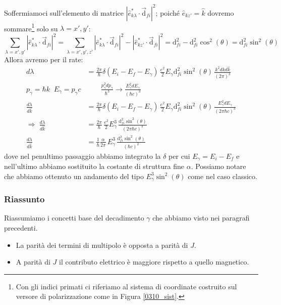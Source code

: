 \newline
\noindent Soffermiamoci sull'elemento di matrice $|\hat{e}^*_{k\lambda}\cdot \vec{\mathrm{d}}_{fi}|^2$; poiché $\hat{e}_{kz'} = \hat{k}$ dovremo sommare\footnote{Con gli indici primati ci riferiamo al sistema di coordinate costruito sul versore di polarizzazione come in Figura \ref{0310_sist}.} solo su $\lambda = x',y'$:
$$\sum_{\lambda = x',y'}|\hat{e}^*_{k\lambda}\cdot \vec{\mathrm{d}}_{fi}|^2 = \sum_{\lambda=x',y',z'} |\hat{e}^*_{k\lambda}\cdot \vec{\mathrm{d}}_{fi}|^2 - |\hat{e}^*_{kz'}\cdot \vec{\mathrm{d}}_{fi}|^2 = \mathrm{d}_{fi}^2 -\mathrm{d}_{fi}^2\cos^2{(\theta)} = \mathrm{d}_{fi}^2 \sin^2{(\theta)} $$
Allora avremo per il rate:
\begin{displaymath}
\begin{aligned}
d\lambda &= \frac{2\pi}{\hbar} \delta(E_i-E_f-E_\gamma) \,\frac{e^2}{2}E_\gamma \mathrm{d}_{fi}^2 \sin^2(\theta) \,  \frac{k^2dkd\hat{k}}{(2\pi)^3} \\
%
p_\gamma = \hbar k \;\; E_\gamma = p_\gamma c &\qquad\frac{p^2_\gamma dp_\gamma}{\hbar^3} \to \frac{E_\gamma^2 dE_\gamma}{(\hbar c)^3}\\
%
\frac{d\lambda}{d\hat{k}} &= \frac{2\pi}{\hbar} \delta(E_i-E_f-E_\gamma) \,\frac{e^2}{2}E_\gamma \mathrm{d}_{fi}^2 \sin^2(\theta) \, \frac{E_\gamma^2 dE_\gamma}{(2\pi\hbar c)^3} \\
%
\Rightarrow \; \frac{d\lambda}{d\hat{k}} &= \frac{2\pi}{\hbar} \,\frac{e^2}{2}E_\gamma^3 \, \frac{\mathrm{d}_{fi}^2 \sin^2(\theta)}{(2\pi \hbar c)^3} \\
%
\frac{d\lambda}{d\hat{k}} &= \frac{1}{\hbar} \frac{\alpha}{2\pi}\,E_\gamma^3 \, \frac{\mathrm{d}_{fi}^2 \sin^2(\theta)}{( \hbar c)^2}
\end{aligned}
\end{displaymath}
dove nel penultimo passaggio abbiamo integrato la $\delta$ per cui $E_\gamma = E_i - E_f$ e nell'ultimo abbiamo sostituito la costante di struttura fine $\alpha$. Possiamo notare che abbiamo ottenuto un andamento del tipo $E^3_\gamma \sin^2(\theta)$ come nel caso classico.

\subsubsection{Riassunto}
Riassumiamo i concetti base del decadimento $\gamma$ che abbiamo visto nei paragrafi precedenti.
\begin{itemize}
    \item La parità dei termini di multipolo è opposta a parità di $J$.
    \item A parità di $J$ il contributo elettrico è maggiore rispetto a quello magnetico.
\end{itemize}

